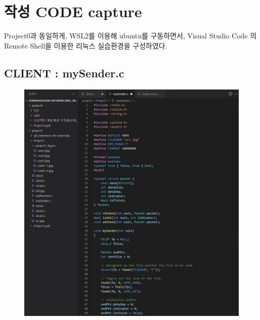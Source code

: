 
	\section*{작성 CODE capture}
    \vspace{-2mm}
	Project0과 동일하게, WSL2를 이용해 ubuntu를 구동하면서, Visual Studio Code 의 Remote Shell을 이용한 
	리눅스 실습환경을 구성하였다.
	\vspace{-6mm}
	\subsection*{CLIENT : mySender.c}
\vspace{-2mm}
	\begin{figure}[!h]
		\centering
			\includegraphics[width=.9\textwidth]{image/code1-1.jpg}
	\end{figure}
\vspace{-8mm}
